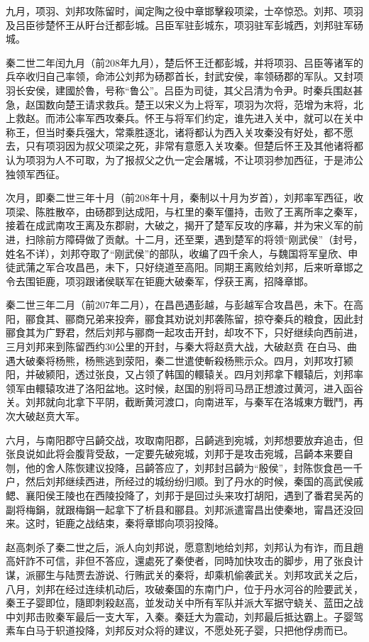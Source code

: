 九月，项羽、刘邦攻陈留时，闻定陶之役中章邯擊殺项梁，士卒惊恐。刘邦、项羽及吕臣徏楚怀王从盱台迁都彭城。吕臣军驻彭城东，项羽驻军彭城西，刘邦驻军砀城。

秦二世二年闰九月（前208年九月），楚后怀王迁都彭城，并将项羽、吕臣等诸军的兵卒收归自己率领，命沛公刘邦为砀郡首长，封武安侯，率领砀郡的军队。又封项羽长安侯，建國於魯，号称“鲁公”。吕臣为司徒，其父吕清为令尹。时秦兵围赵甚急，赵国数向楚王请求救兵。楚王以宋义为上将军，项羽为次将，范增为末将，北上救赵。而沛公率军西攻秦兵。怀王与将军们约定，谁先进入关中，就可以在关中称王，但当时秦兵强大，常乘胜逐北，诸将都认为西入关攻秦没有好处，都不愿去，只有项羽因为叔父项梁之死，非常有意愿入关攻秦。但楚后怀王及其他诸将都认为项羽为人不可取，为了报叔父之仇一定会屠城，不让项羽参加西征，于是沛公独领军西征。

次月，即秦二世三年十月（前208年十月，秦制以十月为岁首），刘邦率军西征，收项梁、陈胜散卒，由砀郡到达成阳，与杠里的秦军僵持，击败了王离所率之秦军，接着在成武南攻王离及东郡尉，大破之，揭开了楚军反攻的序幕，并为宋义军的前进，扫除前方障碍做了贡献。十二月，还至栗，遇到楚军的将领“刚武侯”（封号，姓名不详），刘邦夺取了“刚武侯”的部队，收编了四千余人，与魏国将军皇欣、申徒武蒲之军合攻昌邑，未下，只好绕道至高阳。同期王离败给刘邦，后来听章邯之令去围钜鹿，项羽跟诸侯联军在钜鹿大破秦军，俘获王离，招降章邯。

秦二世三年二月（前207年二月），在昌邑遇彭越，与彭越军合攻昌邑，未下。在高阳，郦食其、郦商兄弟来投奔，郦食其劝说刘邦袭陈留，掠夺秦兵的粮食，因此封郦食其为广野君，然后刘邦与郦商一起攻击开封，却攻不下，只好继续向西前进，三月刘邦来到陈留西约30公里的开封，与秦大将赵贲大战，大破赵贲 在白马、曲遇大破秦将杨熊，杨熊逃到荥阳，秦二世遣使斬殺杨熊示众。四月，刘邦攻打颍阳，并破颍阳，透过张良，又占领了韩国的轘辕关。四月刘邦拿下轘辕后，刘邦率领军由轘辕攻进了洛阳盆地。这时候，赵国的别将司马昂正想渡过黄河，进入函谷关。刘邦就向北拿下平阴，截断黄河渡口，向南进军，与秦军在洛城東方戰鬥，再次大破赵贲大军。

六月，与南阳郡守吕齮交战，攻取南阳郡，吕齮逃到宛城，刘邦想要放弃追击，但张良说如此将会腹背受敌，一定要先破宛城，刘邦于是攻击宛城，吕齮本来要自刎，他的舍人陈恢建议投降，吕齮答应了，刘邦封吕齮为“殷侯”，封陈恢食邑一千户，然后刘邦继续西进，所经过的城纷纷归顺。到了丹水的时候，秦国的高武侯戚鳃、襄阳侯王陵也在西陵投降了，刘邦于是回过头来攻打胡阳，遇到了番君吴芮的副将梅鋗，就跟梅鋗一起拿下了析县和郦县。刘邦派遣甯昌出使秦地，甯昌还没回来。这时，钜鹿之战结束，秦将章邯向项羽投降。

赵高刺杀了秦二世之后，派人向刘邦说，愿意割地给刘邦，刘邦认为有诈，而且趙高奸詐不可信，非但不答应，還處死了秦使者，同時加快攻击的脚步，用了张良计谋，派郦生与陆贾去游说、行贿武关的秦将，却乘机偷袭武关。刘邦攻武关之后，八月，刘邦在经过连续机动后，攻破秦国的东南门户，位于丹水河谷的险要武关，秦王子婴即位，隨即刺殺赵高，並发动关中所有军队并派大军据守蛲关、蓝田之战中刘邦击败秦军最后一支大军，入秦。秦廷大为震动，刘邦最后抵达霸上。子婴驾素车白马于轵道投降，刘邦反对众将的建议，不愿处死子婴，只把他俘虏而已。


